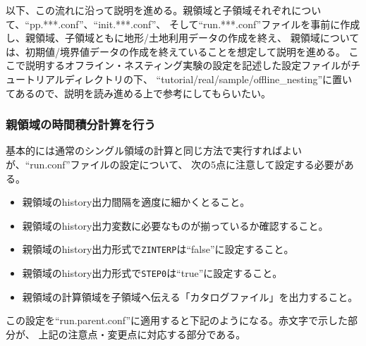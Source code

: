以下、この流れに沿って説明を進める。親領域と子領域それぞれについて、``pp.***.conf''、``init.***.conf''、
そして``run.***.conf''ファイルを事前に作成し、親領域、子領域ともに地形/土地利用データの作成を終え、
親領域については、初期値/境界値データの作成を終えていることを想定して説明を進める。
ここで説明するオフライン・ネスティング実験の設定を記述した設定ファイルがチュートリアルディレクトリの下、
``tutorial/real/sample/offline\_nesting''に置いてあるので、説明を読み進める上で参考にしてもらいたい。

\subsubsection{親領域の時間積分計算を行う}
基本的には通常のシングル領域の計算と同じ方法で実行すればよいが、``run.conf''ファイルの設定について、
次の5点に注意して設定する必要がある。

\begin{itemize}
 \item 親領域のhistory出力間隔を適度に細かくとること。
 \item 親領域のhistory出力変数に必要なものが揃っているか確認すること。
 \item 親領域のhistory出力形式で\verb|ZINTERP|は``false''に設定すること。
 \item 親領域のhistory出力形式で\verb|STEP0|は``true''に設定すること。
 \item 親領域の計算領域を子領域へ伝える「カタログファイル」を出力すること。
\end{itemize}


この設定を``run.parent.conf''に適用すると下記のようになる。赤文字で示した部分が、
上記の注意点・変更点に対応する部分である。\\

\\

